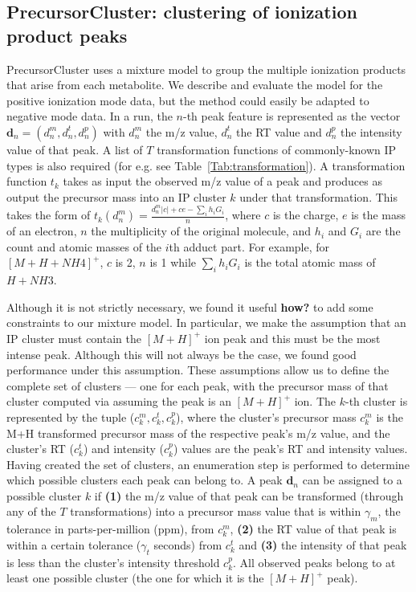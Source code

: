 \subsection{PrecursorCluster: clustering of ionization product peaks\label{sub:ip-clustering}}

PrecursorCluster uses a mixture model to group the multiple ionization products that arise from each metabolite. We describe and evaluate the model for the positive ionization mode data, but the method could easily be adapted to negative mode data. In a run, the $n$-th peak feature is represented as the vector $\textbf{d}_n=(d_n^m,d_n^t,d_n^p)$ with $d_n^m$ the m/z value, $d_n^t$ the RT value and $d_n^p$ the intensity value of that peak. A list of $T$ transformation functions of commonly-known IP types is also required (for e.g. see Table~\ref{Tab:transformation}). A transformation function $t_k$ takes as input the observed m/z value of a peak and produces as output the precursor mass into an IP cluster $k$ under that transformation. This takes the form of $t_k(d_n^m) = \frac{d_n^m|c|+ce-\sum_{i} h_i G_i}{n}$, where $c$ is the charge, $e$ is the mass of an electron, $n$ the multiplicity of the original molecule, and $h_i$ and $G_i$ are the count and atomic masses of the $i$th adduct part. For example, for $[M+H+NH4]^+$, $c$ is 2, $n$ is 1 while $\sum_{i} h_i G_i$ is the total atomic mass of $H+NH3$.

Although it is not strictly necessary, we found it useful \textbf{how?} to add some constraints to our mixture model. In particular, we make the assumption that an IP cluster must contain the $[M+H]^+$ ion peak and this must be the most intense peak. Although this will not always be the case, we found good performance under this assumption. These assumptions allow us to define the complete set of clusters --- one for each peak, with the precursor mass of that cluster computed via assuming the peak is an $[M+H]^+$ ion. The $k$-th cluster is represented by the tuple ($c_k^m,c_k^t,c_k^p$), where the cluster's precursor mass $c_k^m$ is the M+H transformed precursor mass of the respective peak's m/z value, and the cluster's RT ($c_k^t$) and intensity ($c_k^p$) values are the peak's RT and intensity values. Having created the set of clusters, an enumeration step is performed to determine which possible clusters each peak can belong to. A peak $\textbf{d}_n$ can be assigned to a possible cluster $k$ if \textbf{(1)} the m/z value of that peak can be transformed (through any of the $T$ transformations) into a precursor mass value that is within $\gamma_m$, the tolerance in parts-per-million (ppm), from $c_k^m$, \textbf{(2)} the RT value of that peak is within a certain tolerance ($\gamma_t$ seconds) from $c_k^t$ and \textbf{(3)} the intensity of that peak is less than the cluster's intensity threshold $c_k^p$. All observed peaks belong to at least one possible cluster (the one for which it is the $[M+H]^+$ peak).

